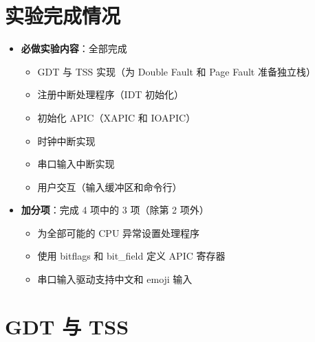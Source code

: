 \documentclass{SYSUReport}
\date{\today}
\begin{document}
\cover
{}
\thispagestyle{empty} %
\clearpage

\clearpage

\setcounter{page}{1}

\section{实验完成情况}

\begin{itemize}
    \item \textbf{必做实验内容}：全部完成
    \begin{itemize}
        \item GDT 与 TSS 实现（为 Double Fault 和 Page Fault 准备独立栈）
        \item 注册中断处理程序（IDT 初始化）
        \item 初始化 APIC（XAPIC 和 IOAPIC）
        \item 时钟中断实现
        \item 串口输入中断实现
        \item 用户交互（输入缓冲区和命令行）
    \end{itemize}
    \item \textbf{加分项}：完成 4 项中的 3 项（除第 2 项外）
    \begin{itemize}
        \item 为全部可能的 CPU 异常设置处理程序
        \item 使用 bitflags 和 bit\_field 定义 APIC 寄存器
        \item 串口输入驱动支持中文和 emoji 输入
    \end{itemize}
\end{itemize}

\section{GDT 与 TSS}
\end{document}
